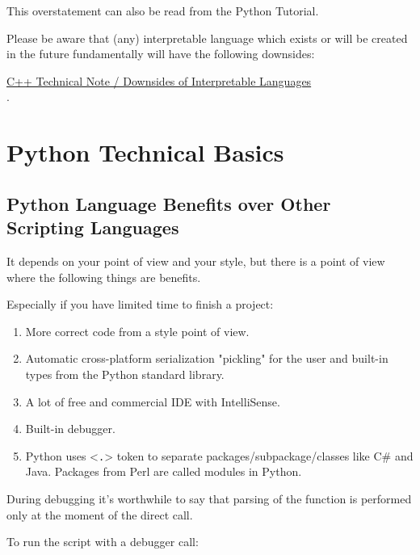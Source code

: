 \documentclass[
]{article}
\begin{document}
This overstatement can also be read from the Python Tutorial.

Please be aware that (any) interpretable language which exists or will
be created in the future fundamentally will have the following
downsides:

\href{https://github.com/burlachenkok/CPP_from_1998_to_2020/blob/main/Cpp-Technical-Note.md\#downsides-of-interpretable-languages}{C++
Technical Note / Downsides of Interpretable Languages\\
}.

\hypertarget{python-technical-basics}{%
\section{Python Technical Basics}\label{python-technical-basics}}

\hypertarget{python-language-benefits-over-other-scripting-languages}{%
\subsection{Python Language Benefits over Other Scripting
Languages}\label{python-language-benefits-over-other-scripting-languages}}

It depends on your point of view and your style, but there is a point of
view where the following things are benefits.

Especially if you have limited time to finish a project:

\begin{enumerate}
\def\labelenumi{\arabic{enumi}.}
\item
  More correct code from a style point of view.
\item
  Automatic cross-platform serialization "pickling" for the user and
  built-in types from the Python standard library.
\item
  A lot of free and commercial IDE with IntelliSense.
\item
  Built-in debugger.
\item
  Python uses \textless{}\texttt{.}\textgreater{} token to separate
  packages/subpackage/classes like C\# and Java. Packages from Perl are
  called modules in Python.
\end{enumerate}

During debugging it's worthwhile to say that parsing of the function is
performed only at the moment of the direct call.

To run the script with a debugger call:
\end{document}
